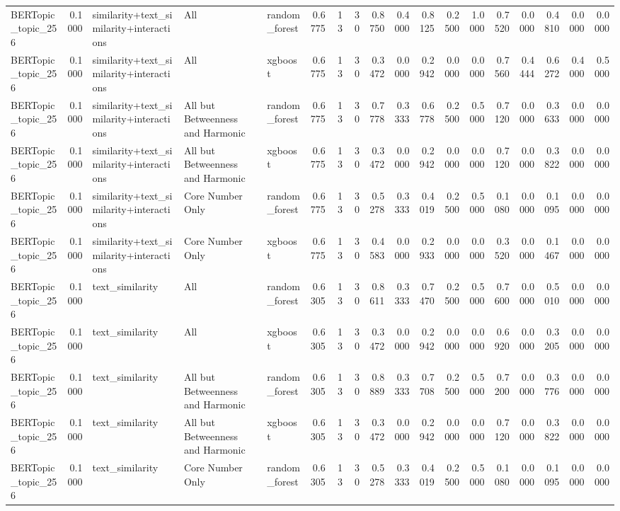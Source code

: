 \begin{tabular}{lrlllrrrrrrrrrrrrr}
BERTopic_topic_256 & 0.1000 & similarity+text_similarity+interactions & All & random_forest & 0.6775 & 13 & 30 & 0.8750 & 0.4000 & 0.8125 & 0.2500 & 1.0000 & 0.7520 & 0.0000 & 0.4810 & 0.0000 & 0.0000 \\
BERTopic_topic_256 & 0.1000 & similarity+text_similarity+interactions & All & xgboost & 0.6775 & 13 & 30 & 0.3472 & 0.0000 & 0.2942 & 0.0000 & 0.0000 & 0.7560 & 0.4444 & 0.6272 & 0.4000 & 0.5000 \\
BERTopic_topic_256 & 0.1000 & similarity+text_similarity+interactions & All but Betweenness and Harmonic & random_forest & 0.6775 & 13 & 30 & 0.7778 & 0.3333 & 0.6778 & 0.2500 & 0.5000 & 0.7120 & 0.0000 & 0.3633 & 0.0000 & 0.0000 \\
BERTopic_topic_256 & 0.1000 & similarity+text_similarity+interactions & All but Betweenness and Harmonic & xgboost & 0.6775 & 13 & 30 & 0.3472 & 0.0000 & 0.2942 & 0.0000 & 0.0000 & 0.7120 & 0.0000 & 0.3822 & 0.0000 & 0.0000 \\
BERTopic_topic_256 & 0.1000 & similarity+text_similarity+interactions & Core Number Only & random_forest & 0.6775 & 13 & 30 & 0.5278 & 0.3333 & 0.4019 & 0.2500 & 0.5000 & 0.1080 & 0.0000 & 0.1095 & 0.0000 & 0.0000 \\
BERTopic_topic_256 & 0.1000 & similarity+text_similarity+interactions & Core Number Only & xgboost & 0.6775 & 13 & 30 & 0.4583 & 0.0000 & 0.2933 & 0.0000 & 0.0000 & 0.3520 & 0.0000 & 0.1467 & 0.0000 & 0.0000 \\
BERTopic_topic_256 & 0.1000 & text_similarity & All & random_forest & 0.6305 & 13 & 30 & 0.8611 & 0.3333 & 0.7470 & 0.2500 & 0.5000 & 0.7600 & 0.0000 & 0.5010 & 0.0000 & 0.0000 \\
BERTopic_topic_256 & 0.1000 & text_similarity & All & xgboost & 0.6305 & 13 & 30 & 0.3472 & 0.0000 & 0.2942 & 0.0000 & 0.0000 & 0.6920 & 0.0000 & 0.3205 & 0.0000 & 0.0000 \\
BERTopic_topic_256 & 0.1000 & text_similarity & All but Betweenness and Harmonic & random_forest & 0.6305 & 13 & 30 & 0.8889 & 0.3333 & 0.7708 & 0.2500 & 0.5000 & 0.7200 & 0.0000 & 0.3776 & 0.0000 & 0.0000 \\
BERTopic_topic_256 & 0.1000 & text_similarity & All but Betweenness and Harmonic & xgboost & 0.6305 & 13 & 30 & 0.3472 & 0.0000 & 0.2942 & 0.0000 & 0.0000 & 0.7120 & 0.0000 & 0.3822 & 0.0000 & 0.0000 \\
BERTopic_topic_256 & 0.1000 & text_similarity & Core Number Only & random_forest & 0.6305 & 13 & 30 & 0.5278 & 0.3333 & 0.4019 & 0.2500 & 0.5000 & 0.1080 & 0.0000 & 0.1095 & 0.0000 & 0.0000 \\

\end{tabular}
